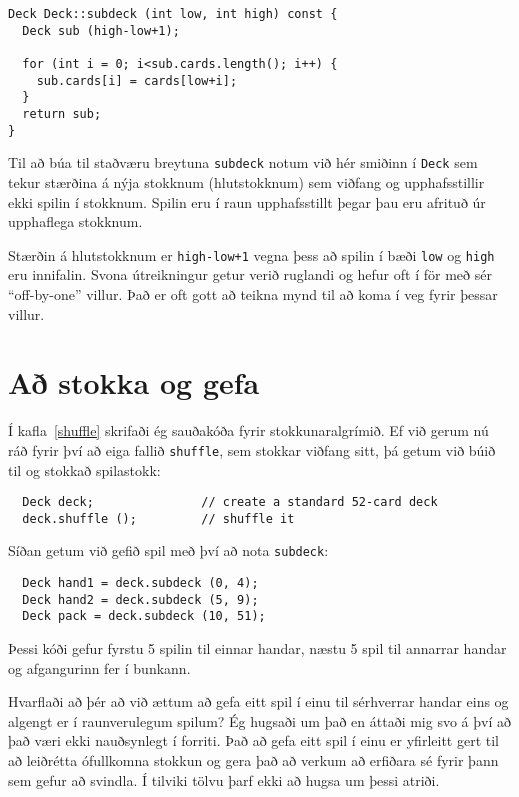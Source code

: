 \begin{verbatim}
Deck Deck::subdeck (int low, int high) const {
  Deck sub (high-low+1);
	
  for (int i = 0; i<sub.cards.length(); i++) {
    sub.cards[i] = cards[low+i];
  }
  return sub;
}
\end{verbatim}
%
Til að búa til staðværu breytuna {\tt subdeck} notum við hér smiðinn í {\tt Deck} sem tekur stærðina á nýja stokknum (hlutstokknum)
sem viðfang og upphafsstillir ekki spilin í stokknum.
Spilin eru í raun upphafsstillt þegar þau eru afrituð úr upphaflega stokknum.

Stærðin á hlutstokknum er {\tt high-low+1} vegna þess að spilin í bæði {\tt low} og {\tt high} eru innifalin.
Svona útreikningur getur verið ruglandi og hefur oft í för með sér ``off-by-one'' villur.
Það er oft gott að teikna mynd til að koma í veg fyrir þessar villur.



\section{Að stokka og gefa}

Í kafla~\ref{shuffle} skrifaði ég sauðakóða fyrir stokkunaralgrímið.
Ef við gerum nú ráð fyrir því að eiga fallið {\tt shuffle}, sem stokkar viðfang sitt, þá getum við búið til og stokkað spilastokk: 

\begin{verbatim}
  Deck deck;               // create a standard 52-card deck
  deck.shuffle ();         // shuffle it
\end{verbatim}
%
Síðan getum við gefið spil með því að nota {\tt subdeck}:

\begin{verbatim}
  Deck hand1 = deck.subdeck (0, 4);
  Deck hand2 = deck.subdeck (5, 9);
  Deck pack = deck.subdeck (10, 51);
\end{verbatim}
%
Þessi kóði gefur fyrstu 5 spilin til einnar handar, næstu 5 spil til annarrar handar og afgangurinn fer í bunkann.

Hvarflaði að þér að við ættum að gefa eitt spil í einu til sérhverrar handar eins og algengt er í raunverulegum spilum?
Ég hugsaði um það en áttaði mig svo á því að það væri ekki nauðsynlegt í forriti.
Það að gefa eitt spil í einu er yfirleitt gert til að leiðrétta ófullkomna stokkun og gera það að verkum að erfiðara sé fyrir þann sem gefur að svindla.
Í tilviki tölvu þarf ekki að hugsa um þessi atriði. 

